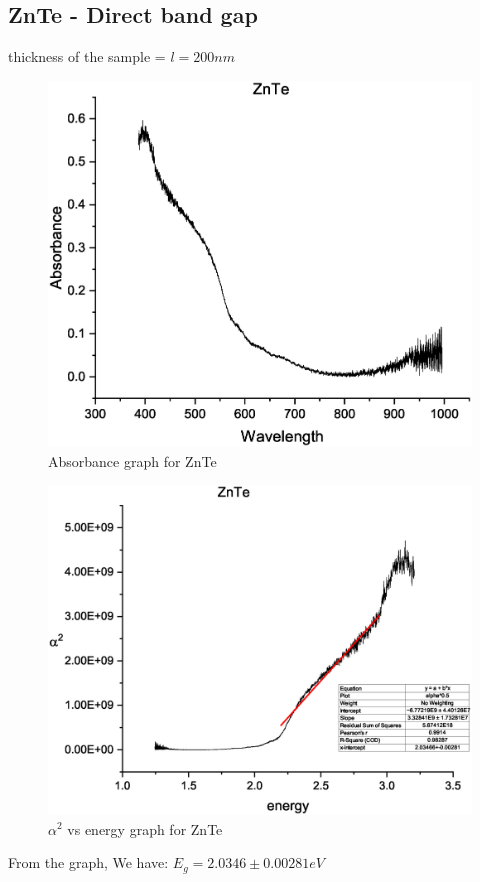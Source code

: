 	\subsection{ZnTe - Direct band gap}
	thickness of the sample = $l = 200nm$
		\begin{figure}[h]
			\centering
			\includegraphics[width=0.8\columnwidth]{images/zna.eps}
			\caption{Absorbance graph for ZnTe}
			\label{graph:3}
		\end{figure}
		\begin{figure}[h]
			\centering
			\includegraphics[width=0.8\columnwidth]{images/znte.eps}
			\caption{$\alpha^2$ vs energy graph for ZnTe}
			\label{graph:4}
		\end{figure}
		From the graph, We have: $E_g= 2.0346\pm0.00281eV$

